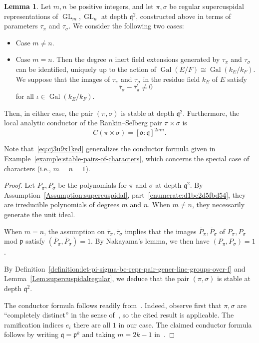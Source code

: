 \documentclass[reqno]{amsart}
\DeclareMathOperator{\GL}{GL}
\DeclareMathOperator{\Gal}{Gal}
\theoremstyle{plain} \newtheorem{theorem} {Theorem} \newtheorem{conjecture} {Conjecture} \newtheorem{corollary} [theorem] {Corollary} \newtheorem{proposition} [theorem] {Proposition} \newtheorem{fact} [theorem] {Fact}
\theoremstyle{definition} \newtheorem{definition} [theorem] {Definition}
\theoremstyle{itplain} %
\newtheorem{lemma}[theorem]{Lemma}
\newcommand{\mfq}{\mathfrak{q}}
\newcommand{\mfp}{\mathfrak{p}}
\begin{document}
\begin{lemma}\label{Lem:supercuspidalstablepair}
  Let $m,n$ be positive integers, and let $\pi, \sigma$ be regular supercuspidal representations of $\GL_{m},\GL_{n}$ at depth $\mfq^2$, constructed above in terms of parameters $\tau_\pi$ and $\tau_\sigma$.  We consider the following two cases:
  \begin{itemize}
  \item Case $m\neq n$.
  \item Case $m=n$.  Then the degree $n$ inert field extensions generated by $\tau_\pi$ and $\tau_\sigma$ can be identified, uniquely up to the action of $\Gal(E/F) \cong \Gal(k_E/k_F)$.  We suppose that the images of $\tau_\pi$ and $\tau_\sigma$ in the residue field $k_E$ of $E$ satisfy
    \begin{equation*}
      \overline{\tau}_\sigma-\overline{\tau}_\pi^\iota\neq 0
    \end{equation*}
    for all $\iota \in \Gal(k_E/k_F)$.
  \end{itemize}
  Then, in either case, the pair $(\pi,\sigma)$ is stable at depth $\mfq^2$.  Furthermore, the local analytic conductor of the Rankin--Selberg pair $\pi\times \sigma$ is
  \begin{equation}\label{eq:cj3u9x1ked}
    C (\pi\times \sigma)={[\mathfrak{o}:\mfq]}^{2mn}.
  \end{equation}
\end{lemma}
Note that~\eqref{eq:cj3u9x1ked} generalizes the conductor formula given in Example~\ref{example:stable-pairs-of-characters}, which concerns the special case of characters (i.e., $m = n = 1$).
\begin{proof}
  Let $P_\pi, P_\sigma$ be the polynomials for $\pi$ and $\sigma$ at depth $\mfq^2$.  By Assumption~\ref{Assumption:supercuspidal}, part~\eqref{enumerate:d1bc2d5fbd54}, they are irreducible polynomials of degrees $m$ and $n$.  When $m\neq n$, they necessarily generate the unit ideal.

  When $m=n$, the assumption on $\overline\tau_\pi,\overline\tau_\sigma$ implies that the images $\overline{P}_\pi, \overline{P}_\sigma$ of $P_\pi,P_\sigma$ mod $\mfp$ satisfy $(\overline{P}_\pi, \overline{P}_\sigma)=1$.  By Nakayama's lemma, we then have $(P_\pi,P_\sigma)=1$.

  By Definition~\ref{definition:let-pi-sigma-be-repr-pair-gener-line-groups-over-f} and Lemma~\ref{Lem:supercuspidalregular}, we deduce that the pair $(\pi,\sigma)$ is stable at depth $\mfq^2$.

  The conductor formula follows readily from~\cite[Theorem 6.5(ii)]{MR1606410}.  Indeed, observe first that $\pi,\sigma$ are ``completely distinct'' in the sense of~\cite[\S6.2]{MR1606410}, so the cited result is applicable. The ramification indices $e_i$ there are all $1$ in our case. The claimed conductor formula follows by writing $\mfq=\mfp ^k$ and taking $m=2k-1$ in~\cite[Theorem 6.5(ii)]{MR1606410}.
\end{proof}
\end{document}
